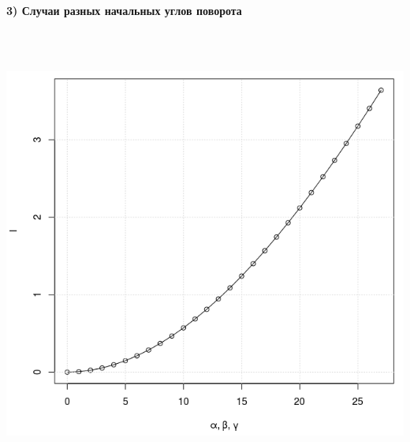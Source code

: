 \documentclass[14pt]{extreport}
\begin{document}
\newpage
\begin{landscape}
\begin{center}
\textbf{3) Случаи разных начальных углов поворота}
\end{center}
\begin{center}
\includegraphics[width=15cm, height=15cm]{va.png}
\end{center}
\end{landscape}
\end{document}
